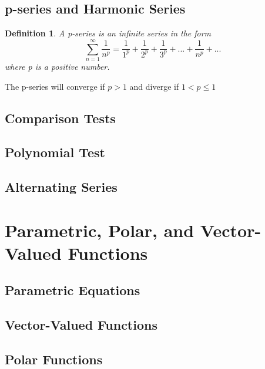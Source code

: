 \documentclass[letterpaper]{report}
\newtheorem{definition}{Definition}
\begin{document}
\section{p-series and Harmonic Series}
\begin{definition}
A p-series is an infinite series in the form
\[ \sum_{n=1}^\infty \frac{1}{n^p}=\frac{1}{1^p}+\frac{1}{2^p}
    +\frac{1}{3^p}+...+\frac{1}{n^p}+... \]
where p is a positive number.
\end{definition}
The p-series will converge if $p>1$ and diverge if $1<p\leq1$
\section{Comparison Tests}
\section{Polynomial Test}
\section{Alternating Series}

\chapter{Parametric, Polar, and Vector-Valued Functions}
\section{Parametric Equations}
\section{Vector-Valued Functions}
\section{Polar Functions}
\end{document}
